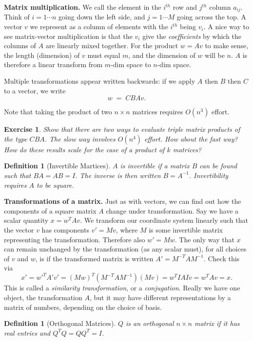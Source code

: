 \documentclass[12pt,letterpaper]{report}
\newcommand\be{\begin{equation}}
\newcommand\ee{\end{equation}}
\newtheorem{defi}[thm]{Definition}
\newtheorem{exe}[thm]{Exercise}
\begin{document}
{\bf Matrix multiplication.} We call the element in the $i^{th}$
row and $j^{th}$ column $a_{ij}$. Think of $i=1\cdots n$ going
down the left side, and $j=1\cdots M$ going across the top. A
vector $v$ we represent as a column of elements with the $i^{th}$
being $v_i$. A nice way to see matrix-vector multiplication is
that the $v_i$ give the {\em coefficients} by which the columns of
$A$ are linearly mixed together. For the product $w = A v$ to make
sense, the length (dimension) of $v$ must equal $m$, and the
dimension of $w$ will be $n$. $A$ is therefore a linear transform
from $m$-dim space to $n$-dim space.

Multiple transformations appear written backwards: if we apply $A$
then $B$ then $C$ to a vector, we write \be
    w \; = \; C B A v .
\ee

Note that taking the product of two $n\times n$ matrices requires
$O(n^3)$ effort.

\begin{exe}
Show that there are two ways to evaluate triple matrix products of
the type $C B A$. The slow way involves $O(n^4)$ effort. How about
the fast way? How do these results scale for the case of a product
of $k$ matrices?\end{exe}

\begin{defi}[Invertible Martices]
$A$ is invertible if a matrix $B$ can be found such that $B A  = A
B  = I$. The inverse is then written $B = A^{-1}$. Invertibility
requires $A$ to be square.
\end{defi}

{\bf Transformations of a matrix.} Just as with vectors, we can
find out how the components of a square matrix $A$ change under
transformation. Say we have a scalar quantity $x  = w^T A v$. We
transform our coordinate system linearly such that the vector $v$
has components $v' = M v$, where $M$ is some invertible matrix
representing the transformation. Therefore also $w' = M w$. The
only way that $x$ can remain unchanged by the transformation (as
any scalar must), for all choices of $v$ and $w$, is if the
transformed matrix is written $A' = M^{-T} A M^{-1}$. Check this
via \be \label{eq:sim} x' = w'^T A' v' = (M w)^T (M^{-T} A M^{-1})
(M v) = w^T I A I v = w^T A v = x. \ee This is called a {\em
similarity transformation}, or a {\em conjugation}. Really we have
one object, the transformation $A$, but it may have different
representations by a matrix of numbers, depending on the choice of
basis.


\begin{defi}[Orthogonal Matrices] $Q$ is an orthogonal $n \times n$ matrix if
it has real entries and $Q^T Q = Q Q^T = I$. \end{defi}
\end{document}

